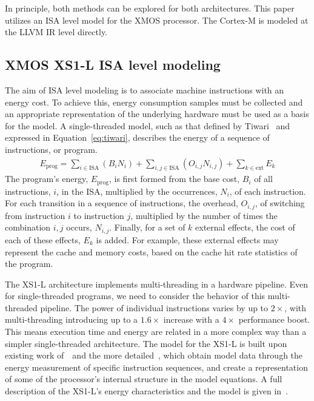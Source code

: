 \documentclass[9pt,preprint]{sigplanconf}
\begin{document}
In principle, both methods can be explored for both architectures. This paper
utilizes an ISA level model for the XMOS processor. The Cortex-M is
modeled at the LLVM IR level directly.

\subsection{XMOS XS1-L ISA level modeling}
\label{sec:xs1model}

The aim of ISA level modeling is to associate machine instructions with an
energy cost. To achieve this, energy consumption samples must be collected and
an appropriate representation of the underlying hardware must be used as a basis
for the model. A single-threaded model, such as that defined by
Tiwari~\cite{Tiwari-embedded-1994} and expressed in Equation~\ref{eq:tiwari},
describes the energy of a sequence of instructions, or program.
\begin{align}
E_{\text{prog}} =
        \sum_{i \in \text{ISA}} \left( B_i N_i \right)
        + \sum_{i,j \in \text{ISA}} \left(O_{i,j} N_{i,j} \right)
        + \sum_{k \in \text{ext}} E_k
\label{eq:tiwari}
\end{align}
The program's energy, $E_{\text{prog}}$, is first formed from the base cost,
$B_i$ of all instructions, $i$, in the ISA, multiplied by the occurrences,
$N_i$, of each instruction. For each transition in a sequence of instructions,
the overhead, $O_{i,j}$, of switching from instruction $i$ to instruction $j$,
multiplied by the number of times the combination $i,j$ occurs, $N_{i,j}$.
Finally, for a set of $k$ external effects, the cost of each of these effects,
$E_k$ is added. For example, these external effects may represent the cache and
memory costs, based on the cache hit rate statistics of the program.

The XS1-L architecture implements multi-threading in a hardware pipeline. Even
for single-threaded programs, we need to consider the behavior of this
multi-threaded pipeline. The power of individual instructions varies by up to
$2\times$, with multi-threading introducing up to a $1.6\times$ increase with a $4\times$ performance
boost.  This means execution time and energy are related in a more complex way
than a simpler single-threaded architecture. The model for the XS1-L is built
upon existing work of~\cite{Tiwari-Instruction-level-1996}~and the more
detailed~\cite{Steinke2001}, which obtain model data through the energy
measurement of specific instruction sequences, and create a representation of
some of the processor's internal structure in the model equations. A full
description of the XS1-L's energy characteristics and the model is given
in~\cite{Kerrison13}.
\end{document}

